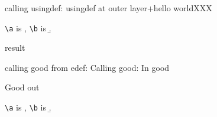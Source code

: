 \documentclass{article}
\begin{document}

\def\usingdef#1+#2XXX{\def\a{#1}\def\b{#2} result\par}
calling usingdef: \usingdef usingdef at outer layer+hello worldXXX\par
\verb|\a| is \a, \verb|\b| is \b. 



\def\mystore#1+#2{\def\a{#1}\def\b{#2} result\par}
\def\mystore#1+#2\pgfeov{\def\a{#1}\def\b{#2} result\par}


calling good from edef:
\edef\good{%
  In good\par%
  \par Good out\par%
}
Calling good: \good\par
\verb|\a| is \a, \verb|\b| is \b. 


\end{document}
